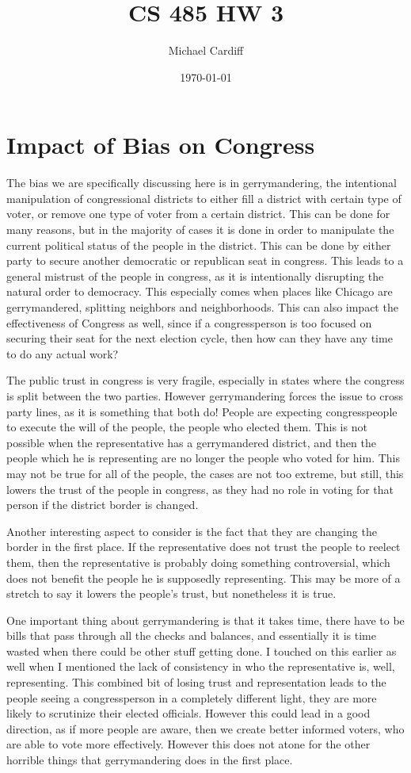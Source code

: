 \documentclass[12pt]{article}
\title{\vspace{-3em}CS 485 HW 3}
\author{Michael Cardiff}
\date{\today}
\begin{document}
\maketitle

\section{Impact of Bias on Congress}
The bias we are specifically discussing here is in gerrymandering, the intentional manipulation of congressional districts to either fill a district with certain type of voter, or remove one type of voter from a certain district. This can be done for many reasons, but in the majority of cases it is done in order to manipulate the current political status of the people in the district. This can be done by either party to secure another democratic or republican seat in congress. This leads to a general mistrust of the people in congress, as it is intentionally disrupting the natural order to democracy. This especially comes when places like Chicago are gerrymandered, splitting neighbors and neighborhoods. This can also impact the effectiveness of Congress as well, since if a congressperson is too focused on securing their seat for the next election cycle, then how can they have any time to do any actual work?

The public trust in congress is very fragile, especially in states where the congress is split between the two parties. However gerrymandering forces the issue to cross party lines, as it is something that both do! People are expecting congresspeople to execute the will of the people, the people who elected them. This is not possible when the representative has a gerrymandered district, and then the people which he is representing are no longer the people who voted for him. This may not be true for all of the people, the cases are not too extreme, but still, this lowers the trust of the people in congress, as they had no role in voting for that person if the district border is changed.

Another interesting aspect to consider is the fact that they are changing the border in the first place. If the representative does not trust the people to reelect them, then the representative is probably doing something controversial, which does not benefit the people he is supposedly representing. This may be more of a stretch to say it lowers the people's trust, but nonetheless it is true.

One important thing about gerrymandering is that it takes time, there have to be bills that pass through all the checks and balances, and essentially it is time wasted when there could be other stuff getting done. I touched on this earlier as well when I mentioned the lack of consistency in who the representative is, well, representing. This combined bit of losing trust and representation leads to the people seeing a congressperson in a completely different light, they are more likely to scrutinize their elected officials. However this could lead in a good direction, as if more people are aware, then we create better informed voters, who are able to vote more effectively. However this does not atone for the other horrible things that gerrymandering does in the first place. 
\end{document}
